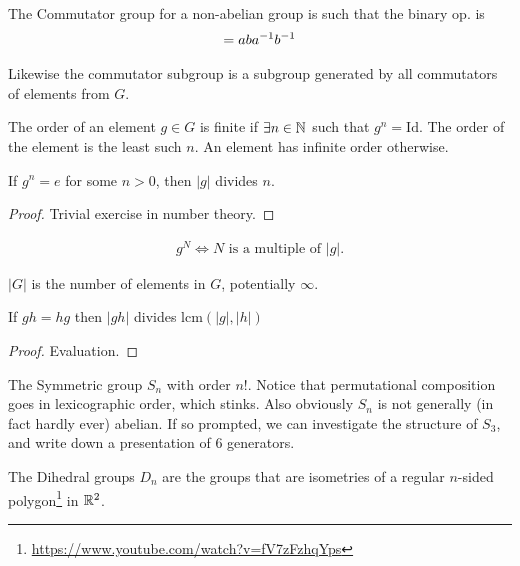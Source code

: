 \documentclass[12pt, twosided]{article}
\begin{document}
  \begin{exa}
    The Commutator group for a non-abelian group is such that the binary op. is
    \begin{align*}
      [a, b] = aba\1b\1
    \end{align*}

    Likewise the commutator subgroup is a subgroup generated by all commutators of elements from \(G\).
  \end{exa}

  \begin{df}
    The order of an element \(g \in G\) is finite if \(\exists n \in \mathbb{N}\) such that \(g^n = \mathrm{Id}\). The order of the element is the least such \(n\). An element has infinite order otherwise.
  \end{df}

  \begin{lm}
    If \(g^n = e\) for some \(n > 0\), then \(|g|\) divides \(n\).
  \end{lm}
  \begin{proof}
    Trivial exercise in number theory.
  \end{proof}

  \begin{cor}
    \begin{align*}
      g^N \Leftrightarrow N \text{ is a multiple of } |g|.
    \end{align*}
  \end{cor}

  \begin{df}
    \(|G|\) is the number of elements in \(G\), potentially \(\infty\).
  \end{df}

  \begin{prop}
    If \(gh = hg\) then \(|gh|\) divides \(\mathrm{lcm}(|g|, |h|)\)
  \end{prop}
  \begin{proof}
    Evaluation.
  \end{proof}

  \begin{exa}
    The Symmetric group \(S_n\) with order \(n!\). Notice that permutational composition goes in lexicographic order, which stinks. Also obviously \(S_n\) is not generally (in fact hardly ever) abelian. If so prompted, we can investigate the structure of \(S_3\), and write down a presentation of 6 generators.
  \end{exa}

  \begin{exa}
    The Dihedral groups \(D_n\) are the groups that are isometries of a regular \(n\)-sided polygon\footnote{\url{https://www.youtube.com/watch?v=fV7zFzhqYps}} in \(\mathbb{R}^2\).
  \end{exa}
\end{document}
